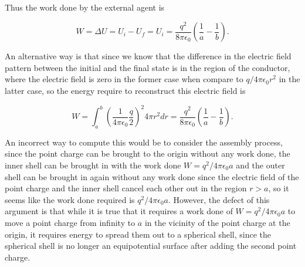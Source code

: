 \documentclass[english,a4paper,12pt]{report}
\begin{document}
{Thus the work done by the external agent is

\begin{equation}
    W = \Delta U = U_{i} - U_{f} = U_{i} = \frac{q^2}{8\pi \epsilon_0} \left(\frac{1}{a} - \frac{1}{b} \right) .
\end{equation}

An alternative way is that since we know that the difference in the electric field pattern between the initial and the final state is in the region of the conductor, where the electric field is zero in the former case when compare to \(q/4\pi \epsilon_0 r^2 \) in the latter case, so the energy require to reconstruct this electric field is 

\begin{equation}
    W = \int_{a}^{b} \left(\frac{1}{4\pi\epsilon_0} \frac{q}{2} \right)^2 4\pi r^2dr =   \frac{q^2}{8\pi \epsilon_0} \left(\frac{1}{a} - \frac{1}{b} \right) .
\end{equation}

An incorrect way to compute this would be to consider the assembly process, since the point charge can be brought to the origin without any work done, the inner shell can be brought in with the work done \( W =  q^2/4\pi \epsilon_0 a\) and the outer shell can be brought in again without any work done since the electric field of the point charge and the inner shell cancel each other out in the region \(r > a\), so it seems like the work done required is \( q^2 /4\pi \epsilon_0 a\). However, the defect of this argument is that while it is true that it requires a work done of \(W = q^2/4\pi \epsilon_0 a \) to move a point charge from infinity to \(a\) in the vicinity of the point charge at the origin, it requires energy to spread them out to a spherical shell, since the spherical shell is no longer an equipotential surface after adding the second point charge.}

\end{document}
